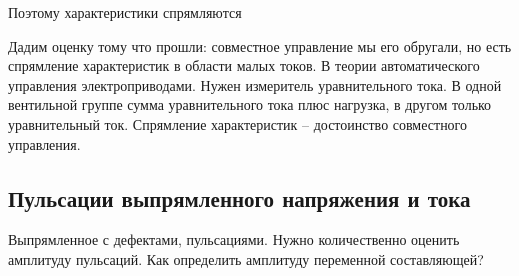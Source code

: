 Поэтому характеристики спрямляются


Дадим оценку тому что прошли: совместное управление мы его обругали,
но есть спрямление характеристик в области малых токов.
В теории автоматического управления электроприводами.  
Нужен измеритель  уравнительного тока. В одной вентильной группе сумма
уравнительного тока плюс нагрузка, в другом только уравнительный ток.
Спрямление характеристик -- достоинство совместного управления.

\subsection{Пульсации выпрямленного напряжения и тока}
Выпрямленное с дефектами, пульсациями. Нужно количественно оценить амплитуду
пульсаций. Как определить амплитуду переменной составляющей?


